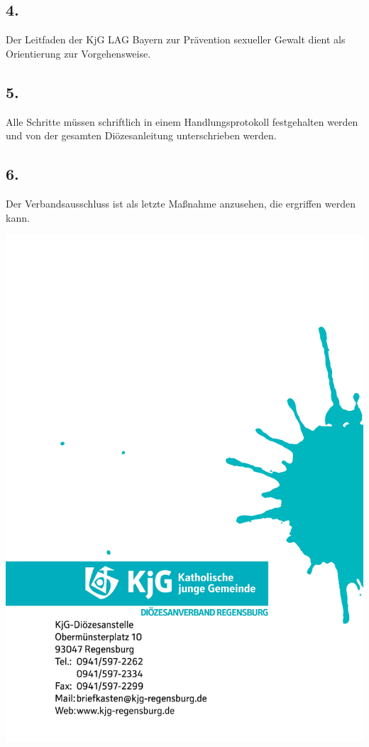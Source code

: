 \documentclass[12pt]{report}
\begin{document}
\begin{flushleft}
\subsection*{4.}
Der Leitfaden der KjG LAG Bayern zur Prävention sexueller Gewalt dient als Orientierung zur Vorgehensweise.
\subsection*{5.}
Alle Schritte müssen schriftlich in einem Handlungsprotokoll festgehalten werden und von der gesamten
Diözesanleitung unterschrieben werden.
\subsection*{6.}
Der Verbandsausschluss ist als letzte Maßnahme anzusehen, die ergriffen werden kann.

\newpage
\pagestyle{empty}
\includegraphics[width=\paperwidth, height=\paperheight]{kjgsatzungende.png}
\restoregeometry
\end{flushleft}
\end{document}
